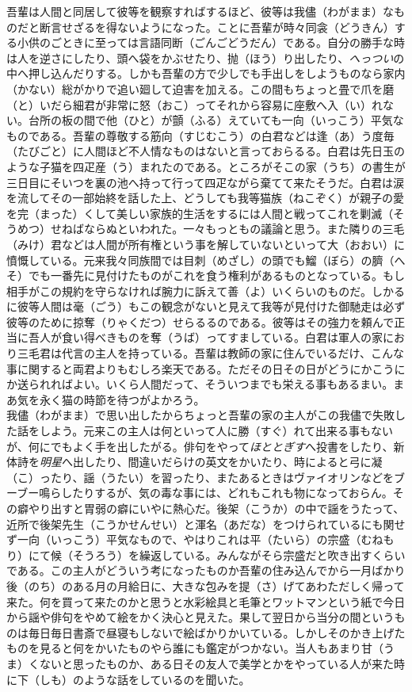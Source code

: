 \documentclass{book}
\begin{document}
吾輩は人間と同居して彼等を観察すればするほど、彼等は我儘（わがまま）なものだと断言せざるを得ないようになった。ことに吾輩が時々同衾（どうきん）する小供のごときに至っては言語同断（ごんごどうだん）である。自分の勝手な時は人を逆さにしたり、頭へ袋をかぶせたり、抛（ほう）り出したり、\emph{へっつい}の中へ押し込んだりする。しかも吾輩の方で少しでも手出しをしようものなら家内（かない）総がかりで追い廻して迫害を加える。この間もちょっと畳で爪を磨（と）いだら細君が非常に怒（おこ）ってそれから容易に座敷へ入（い）れない。台所の板の間で他（ひと）が顫（ふる）えていても一向（いっこう）平気なものである。吾輩の尊敬する筋向（すじむこう）の白君などは逢（あ）う度毎（たびごと）に人間ほど不人情なものはないと言っておらるる。白君は先日玉のような子猫を四疋産（う）まれたのである。ところがそこの家（うち）の書生が三日目にそいつを裏の池へ持って行って四疋ながら棄てて来たそうだ。白君は涙を流してその一部始終を話した上、どうしても我等猫族（ねこぞく）が親子の愛を完（まった）くして美しい家族的生活をするには人間と戦ってこれを剿滅（そうめつ）せねばならぬといわれた。一々もっともの議論と思う。また隣りの三毛（みけ）君などは人間が所有権という事を解していないといって大（おおい）に憤慨している。元来我々同族間では目刺（めざし）の頭でも鰡（ぼら）の臍（へそ）でも一番先に見付けたものがこれを食う権利があるものとなっている。もし相手がこの規約を守らなければ腕力に訴えて善（よ）いくらいのものだ。しかるに彼等人間は毫（ごう）もこの観念がないと見えて我等が見付けた御馳走は必ず彼等のために掠奪（りゃくだつ）せらるるのである。彼等はその強力を頼んで正当に吾人が食い得べきものを奪（うば）ってすましている。白君は軍人の家におり三毛君は代言の主人を持っている。吾輩は教師の家に住んでいるだけ、こんな事に関すると両君よりもむしろ楽天である。ただその日その日がどうにかこうにか送られればよい。いくら人間だって、そういつまでも栄える事もあるまい。まあ気を永く猫の時節を待つがよかろう。\\
我儘（わがまま）で思い出したからちょっと吾輩の家の主人がこの我儘で失敗した話をしよう。元来この主人は何といって人に勝（すぐ）れて出来る事もないが、何にでもよく手を出したがる。俳句をやって\emph{ほととぎす}へ投書をしたり、新体詩を\emph{明星}へ出したり、間違いだらけの英文をかいたり、時によると弓に凝（こ）ったり、謡（うたい）を習ったり、またあるときはヴァイオリンなどをブーブー鳴らしたりするが、気の毒な事には、どれもこれも物になっておらん。その癖やり出すと胃弱の癖にいやに熱心だ。後架（こうか）の中で謡をうたって、近所で後架先生（こうかせんせい）と渾名（あだな）をつけられているにも関せず一向（いっこう）平気なもので、やはりこれは平（たいら）の宗盛（むねもり）にて候（そうろう）を繰返している。みんながそら宗盛だと吹き出すくらいである。この主人がどういう考になったものか吾輩の住み込んでから一月ばかり後（のち）のある月の月給日に、大きな包みを提（さ）げてあわただしく帰って来た。何を買って来たのかと思うと水彩絵具と毛筆とワットマンという紙で今日から謡や俳句をやめて絵をかく決心と見えた。果して翌日から当分の間というものは毎日毎日書斎で昼寝もしないで絵ばかりかいている。しかしそのかき上げたものを見ると何をかいたものやら誰にも鑑定がつかない。当人もあまり甘（うま）くないと思ったものか、ある日その友人で美学とかをやっている人が来た時に下（しも）のような話をしているのを聞いた。\\
\end{document}
